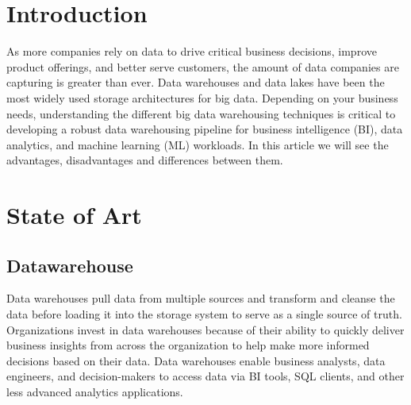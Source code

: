 \documentclass{article}
\begin{document}
\newpage 


\begin{multicols}{2}

\section{Introduction}
As more companies rely on data to drive critical business decisions, improve product offerings, and better serve customers, the amount of data companies are capturing is greater than ever.
Data warehouses and data lakes have been the most widely used storage architectures for big data.
Depending on your business needs, understanding the different big data warehousing techniques is critical to developing a robust data warehousing pipeline for business intelligence (BI), data analytics, and machine learning (ML) workloads.
In this article we will see the advantages, disadvantages and differences between them.
 
\section{State of Art}

\subsection{Datawarehouse}
Data warehouses pull data from multiple sources and transform and cleanse the data before loading it into the storage system to serve as a single source of truth. Organizations invest in data warehouses because of their ability to quickly deliver business insights from across the organization to help make more informed decisions based on their data.
Data warehouses enable business analysts, data engineers, and decision-makers to access data via BI tools, SQL clients, and other less advanced analytics applications.


\end{multicols}
\end{document}
